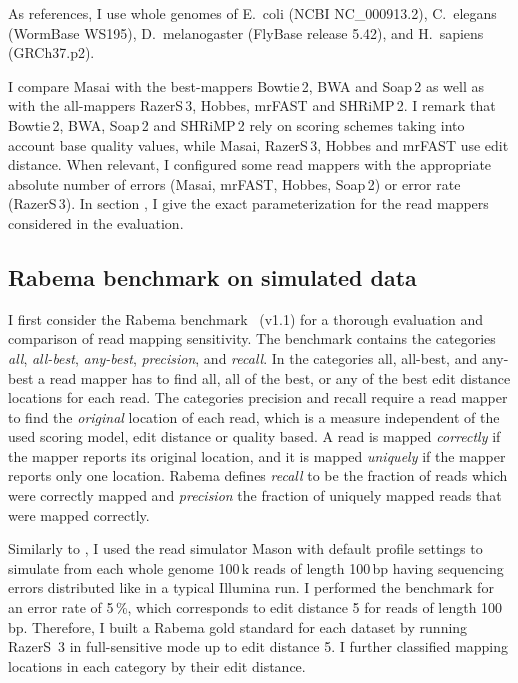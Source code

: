 As references, I use whole genomes of E.~coli (NCBI NC\_000913.2), C.~elegans (WormBase WS195), D.~melanogaster (FlyBase release 5.42), and H.~sapiens (GRCh37.p2).

I compare Masai with the best-mappers Bowtie\,2, BWA and Soap\,2 as well as with the all-mappers RazerS\,3, Hobbes, mrFAST and SHRiMP\,2.
I remark that Bowtie\,2, BWA, Soap\,2 and SHRiMP\,2 rely on scoring schemes taking into account base quality values, while Masai, RazerS\,3, Hobbes and mrFAST use edit distance.
When relevant, I configured some read mappers with the appropriate absolute number of errors (Masai, mrFAST, Hobbes, Soap\,2) or error rate (RazerS\,3).
In section \label{sup:masai:param}, I give the exact parameterization for the read mappers considered in the evaluation.

\subsection{Rabema benchmark on simulated data}

I first consider the Rabema benchmark~\citep{Holtgrewe2011} (v1.1) for a thorough evaluation and comparison of read mapping sensitivity.
The benchmark contains the categories \emph{all}, \emph{all-best}, \emph{any-best}, \emph{precision}, and \emph{recall}.
In the categories all, all-best, and any-best a read mapper has to find all, all of the best, or any of the best edit distance locations for each read.
The categories precision and recall require a read mapper to find the \emph{original} location of each read, which is a measure independent of the used scoring model, \eg edit distance or quality based.
A read is mapped \emph{correctly} if the mapper reports its original location, 
and it is mapped \emph{uniquely} if the mapper reports only one location.
Rabema defines \emph{recall} to be the fraction of reads which were correctly mapped and \emph{precision} the fraction of uniquely mapped reads that were mapped correctly.

Similarly to \citep{Langmead2012}, I used the read simulator Mason \citep{Holtgrewe2010} with default profile settings to simulate from each whole genome 100\,k reads of length 100\,bp having sequencing errors distributed like in a typical Illumina run.
I performed the benchmark for an error rate of 5\,\%, which corresponds to edit distance 5 for reads of length 100\,bp. Therefore, I built a Rabema gold standard for each dataset by running RazerS~3 in full-sensitive mode up to edit distance 5. I further classified mapping locations in each category by their edit distance.


